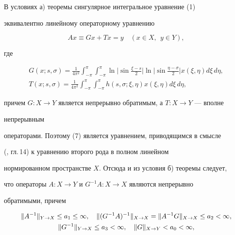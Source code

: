  


\begin{pf} 


В условиях а) теоремы сингулярное интегральное уравнение (1) 


эквивалентно линейному операторному уравнению 


\begin{equation} 


Ax\equiv G x+T x=y\quad (x\in X,\ \ y\in Y), 


\end{equation} 


где 


\begin{gather*} 


G(x;s,\sigma)=\frac{1}{4\pi^2}\int^\pi_{-\pi} 


\int^\pi_{-\pi}\ln\bigg|\sin\frac{\xi-s}{2}\bigg|\ln 


\bigg|\sin\frac{\eta-\sigma}{2}\bigg|x(\xi,\eta)d\xi\,d\eta, \\ 


T(x;s,\sigma)=\frac{1}{4\pi^2}\int^\pi_{-\pi} 


\int^\pi_{-\pi}h(s,\sigma;\xi,\eta)x(\xi,\eta)d\xi\,d\eta, 


\end{gather*} 


причем $G:X\to Y$ является непрерывно обратимым, а $T:X\to Y$ --- вполне 


непрерывным 


операторами. Поэтому (7) является уравнением, приводящимся в смысле 


(\cite{6}, гл.\,14) к уравнению второго рода в полном линейном 


нормированном пространстве $X$. Отсюда и из условия б) теоремы следует, 


что операторы $A:X\to Y$ и $G^{-1}A:X\to X$ являются непрерывно 


обратимыми, причем 


\begin{gather} 


\|A^{-1}\|_{Y\to X}\le a_1\le\infty,\quad 


\|(G^{-1}A)^{-1}\|_{X\to X}=\|A^{-1}G\|_{X\to X} 


\le a_2<\infty, \notag \\ 


% 


\|G^{-1}\|_{Y\to X}\le a_3<\infty,\quad 


\|G\|_{X\to Y}<a_0<\infty, 



\end{gather}
\end{pf}
